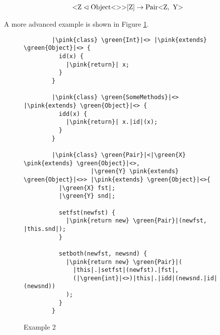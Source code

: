 \begin{align*}
    \text{<} \text{Z} \vartriangleleft \nvtt{Object}{}\text{>}[\text{Z}] \to \nvtt{Pair}{\text{Z}, \ \text{Y}}\\
\end{align*}

A more advanced example is shown in Figure \ref{example2}.

\begin{figure}[H]
    \begin{verbatim}
        |\pink{class} \green{Int}|<> |\pink{extends} \green{Object}|<> {
          id(x) {
            |\pink{return}| x;
          }
        }

        |\pink{class} \green{SomeMethods}|<> |\pink{extends} \green{Object}|<> {
          idd(x) {
            |\pink{return}| x.|id|(x);
          }
        }

        |\pink{class} \green{Pair}|<|\green{X} \pink{extends} \green{Object}|<>,
                   |\green{Y} \pink{extends} \green{Object}|<>> |\pink{extends} \green{Object}|<>{
          |\green{X} fst|;
          |\green{Y} snd|;

          setfst(newfst) {
            |\pink{return new} \green{Pair}|(newfst, |this.snd|);
          }

          setboth(newfst, newsnd) {
            |\pink{return new} \green{Pair}|(
              |this|.|setfst|(newfst).|fst|,
              (|\green{int}|<>)|this|.|idd|(newsnd.|id|(newsnd))
            );
          }
        }
    \end{verbatim}
    \caption{Example 2}
    \label{example2}
\end{figure}

